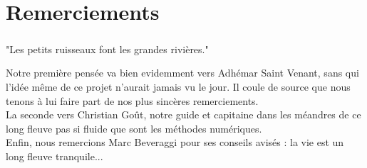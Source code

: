 \maketitle
\setcounter{page}{0}

\chapter*{Remerciements}
\paragraph{}
\begin{center}
"Les petits ruisseaux font les grandes rivières."
\end{center}

Notre première pensée va bien evidemment vers Adhémar Saint Venant, sans qui l'idée même de ce projet n'aurait jamais vu le jour. Il coule de source que nous tenons à lui faire part de nos plus sincères remerciements.\\

La seconde vers Christian Goût, notre guide et capitaine dans les méandres de ce long fleuve pas si fluide que sont les méthodes numériques.\\

Enfin, nous remercions Marc Beveraggi pour ses conseils avisés : la vie est un long fleuve tranquile... 


\thispagestyle{empty}
\newpage
\thispagestyle{empty}
\setcounter{page}{0}
\tableofcontents
\thispagestyle{empty}



